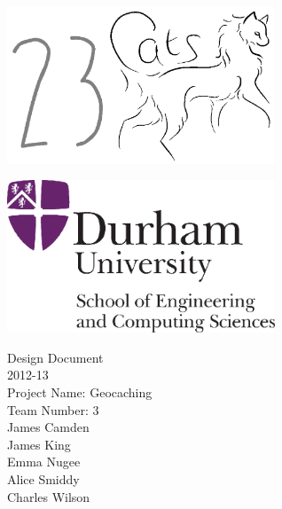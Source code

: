 \newcommand{\authorline}[1]{{\LARGE #1}\\[1cm]}

\begin{titlepage}
\begin{center}
\begin{minipage}{0.4\textwidth}
\begin{flushleft}
\includegraphics[width=0.6\textwidth]{cats}~\\[2cm]
\end{flushleft}
\end{minipage}
\begin{minipage}{0.4\textwidth}
\begin{flushright}
\includegraphics[width=0.6\textwidth]{logo}~\\[2cm]
\end{flushright}
\end{minipage}

\vspace{3cm}

{\Huge Design Document} \\
[1cm]

{\Huge 2012-13} \\
[1cm]

{\Huge Project Name: Geocaching} \\
[2cm]

{\huge Team Number: 3} \\
[1cm]

\authorline{James Camden}

\authorline{James King}

\authorline{Emma Nugee}

\authorline{Alice Smiddy}

\authorline{Charles Wilson}
\end{center}
\end{titlepage}
